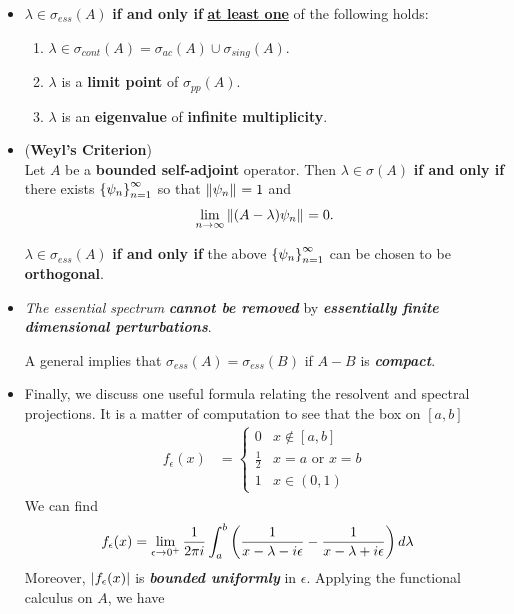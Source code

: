 \documentclass[11pt]{article}
\begin{document}
\begin{itemize}
\item \begin{proposition}
$\lambda \in \sigma_{ess}(A)$ \textbf{if and only if} \underline{\textbf{at least one}} of the following holds: 
\begin{enumerate}
\item $\lambda \in \sigma_{cont}(A) = \sigma_{ac}(A)  \cup \sigma_{sing}(A)$. 
\item $\lambda$ is a \textbf{limit point} of $\sigma_{pp}(A)$.
\item $\lambda$ is an \textbf{eigenvalue} of \textbf{infinite multiplicity}. 
\end{enumerate}
\end{proposition}




\item \begin{theorem} (\textbf{Weyl's Criterion}) \citep{reed1980methods}\\
Let $A$ be a \textbf{bounded self-adjoint} operator. Then $\lambda \in \sigma(A)$ \textbf{if and only if} there exists $\left\{\psi_n\right\}_{n=1}^{\infty}$ so that $\left\|\psi_n\right\|_{} = 1$ 
and
\begin{align*}
\lim\limits_{n\to \infty}\left\|(A - \lambda)\psi_n\right\|_{} = 0.
\end{align*}

$\lambda \in \sigma_{ess}(A)$ \textbf{if and only if} the above $\left\{\psi_n\right\}_{n=1}^{\infty}$ can be chosen to be \textbf{orthogonal}. 
\end{theorem}

\item \begin{remark}
\emph{The essential spectrum} \emph{\textbf{cannot be removed}} by \emph{\textbf{essentially finite dimensional perturbations}}. 

A general implies that $\sigma_{ess}(A) = \sigma_{ess}(B)$ if $A - B$ is \textbf{\emph{compact}}. 
\end{remark}

\item \begin{remark}
Finally, we discuss one useful formula relating the resolvent and spectral projections. It is a matter of computation to see that the box on $[a,b]$
\begin{align*}
f_{\epsilon}(x) &= \left\{ \begin{array}{cc}
0 & x \not\in [a, b]\\
\frac{1}{2} & x=a \text{ or }x=b\\
1 & x \in (0,1)
\end{array}
\right.
\end{align*} We can find 
\begin{align*}
f_{\epsilon}(x) &= \lim\limits_{\epsilon \rightarrow 0^{+}}\frac{1}{2\pi i} \int_{a}^{b}\left(\frac{1}{x- \lambda - i \epsilon} - \frac{1}{x - \lambda + i\epsilon}\right) d\lambda
\end{align*} Moreover,  $\left\lvert f_{\epsilon}(x) \right\rvert$ is \emph{\textbf{bounded uniformly}} in $\epsilon$. Applying the functional calculus on $A$, we have
\end{remark}


\end{itemize}
\end{document}
